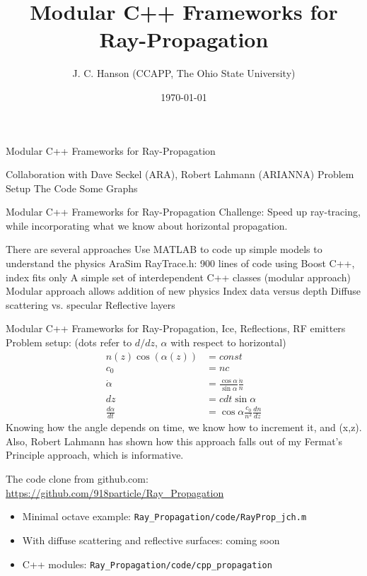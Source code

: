\documentclass{beamer}
\title{Modular C++ Frameworks for Ray-Propagation}
\date{\today}
\author{J. C. Hanson (CCAPP, The Ohio State University)}
\institute{CCAPP @ OSU}
\begin{document}
 \maketitle

\begin{frame}{Modular C++ Frameworks for Ray-Propagation}
\begin{outline}[enumerate]
\1 Collaboration with Dave Seckel (ARA), Robert Lahmann (ARIANNA)
\1 Problem Setup
\1 The Code
\1 Some Graphs
\end{outline}
\end{frame}

\begin{frame}{Modular C++ Frameworks for Ray-Propagation}
\small
Challenge: Speed up ray-tracing, while incorporating what we know about horizontal propagation.
\begin{outline}[enumerate]
\1 There are several approaches
\2 Use MATLAB to code up simple models to understand the physics
\2 AraSim RayTrace.h: 900 lines of code using Boost C++, index fits only
\2 A simple set of interdependent C++ classes (modular approach)
\1 Modular approach allows addition of new physics
\2 Index data versus depth
\2 Diffuse scattering vs. specular
\2 Reflective layers
\end{outline}
\end{frame}

\begin{frame}{Modular C++ Frameworks for Ray-Propagation, Ice, Reflections, RF emitters}
\small
Problem setup: (dots refer to $d/dz$, $\alpha$ with respect to horizontal)
\begin{align}
n(z)\cos(\alpha(z)) &= const \\
c_0 &= n c \\
\dot{\alpha} &= \frac{\cos\alpha}{\sin\alpha}\frac{\dot{n}}{n} \\
dz &= c dt \sin\alpha \\
\frac{d\alpha}{dt} &= \cos\alpha \frac{c_0}{n^2} \frac{dn}{dz}
\end{align}
Knowing how the angle depends on time, we know how to increment it, and (x,z).  Also, Robert Lahmann has shown how this approach falls out of my Fermat's Principle approach, which is informative.
\end{frame}

\begin{frame}{The code}
clone from github.com:
\url{https://github.com/918particle/Ray_Propagation}
\begin{itemize}
\item Minimal octave example: \texttt{Ray\_Propagation/code/RayProp\_jch.m}
\item With diffuse scattering and reflective surfaces: coming soon
\item C++ modules: \texttt{Ray\_Propagation/code/cpp\_propagation}
\end{itemize}
\end{frame}
\end{document}
